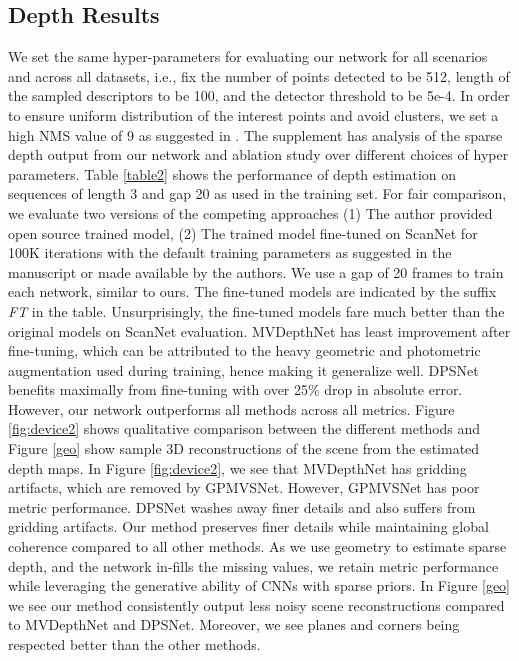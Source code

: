 \documentclass[runningheads]{llncs}
\begin{document}
\subsection{Depth Results}
We set the same hyper-parameters for evaluating our network for all scenarios and across all datasets, i.e., fix the number of points detected to be 512, length of the sampled descriptors to be 100, and the detector threshold to be 5e-4. In order to ensure uniform distribution of the interest points and avoid clusters, we set a high NMS value of 9 as suggested in \cite{superpoint}. The supplement has analysis of the sparse depth output from our network and ablation study over different choices of hyper parameters. Table \ref{table2} shows the performance of depth estimation on sequences of length 3 and gap 20 as used in the training set. For fair comparison, we evaluate two versions of the competing approaches (1) The author provided open source trained model, (2) The trained model fine-tuned on ScanNet for 100K iterations with the default training parameters as suggested in the manuscript or made available by the authors. We use a gap of 20 frames to train each network, similar to ours. The fine-tuned models are indicated by the suffix \emph{FT} in the table. Unsurprisingly, the fine-tuned models fare much better than the original models on ScanNet evaluation. MVDepthNet has least improvement after fine-tuning, which can be attributed to the heavy geometric and photometric augmentation used during training, hence making it generalize well. DPSNet benefits maximally from fine-tuning with over 25\% drop in absolute error. However, our network outperforms all methods across all metrics. Figure \ref{fig:device2} shows qualitative comparison between the different methods and Figure \ref{geo} show sample 3D reconstructions of the scene from the estimated depth maps. In Figure \ref{fig:device2}, we see that MVDepthNet has gridding artifacts, which are removed by GPMVSNet. However, GPMVSNet has poor metric performance. DPSNet washes away finer details and also suffers from gridding artifacts. Our method preserves finer details while maintaining global coherence compared to all other methods. As we use geometry to estimate sparse depth, and the network in-fills the missing values, we retain metric performance while leveraging the generative ability of CNNs with sparse priors. In Figure \ref{geo} we see our method consistently output less noisy scene reconstructions compared to MVDepthNet and DPSNet. Moreover, we see planes and corners being respected better than the other methods. 
\end{document}
